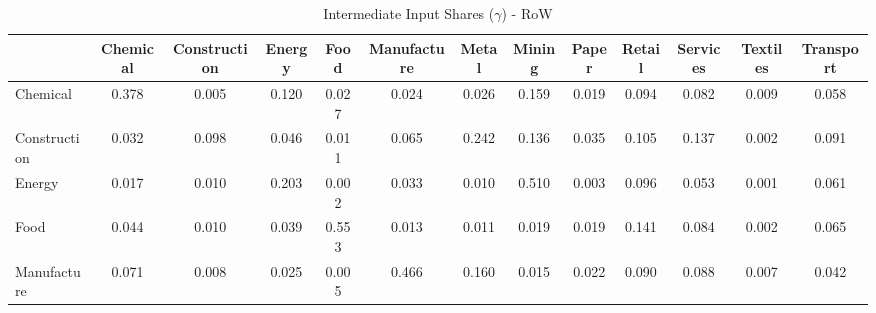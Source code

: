 \begin{table}[htbp]
\centering
\caption{Intermediate Input Shares ($\gamma$) - RoW} 
\label{tab:gamma_RoW}
\begin{tabular}{lcccccccccccc}
  \hline
 & Chemical & Construction & Energy & Food & Manufacture & Metal & Mining & Paper & Retail & Services & Textiles & Transport \\ 
  \hline
Chemical & \textcolor[RGB]{14,9,241}{0.378} & \textcolor[RGB]{234,151,21}{0.005} & \textcolor[RGB]{41,26,214}{0.120} & \textcolor[RGB]{154,100,101}{0.027} & \textcolor[RGB]{168,109,87}{0.024} & \textcolor[RGB]{163,105,92}{0.026} & \textcolor[RGB]{32,21,223}{0.159} & \textcolor[RGB]{181,117,74}{0.019} & \textcolor[RGB]{64,41,191}{0.094} & \textcolor[RGB]{80,52,175}{0.082} & \textcolor[RGB]{220,142,35}{0.009} & \textcolor[RGB]{110,71,145}{0.058} \\ 
  Construction & \textcolor[RGB]{152,99,103}{0.032} & \textcolor[RGB]{57,37,198}{0.098} & \textcolor[RGB]{124,80,131}{0.046} & \textcolor[RGB]{209,135,46}{0.011} & \textcolor[RGB]{103,66,152}{0.065} & \textcolor[RGB]{19,13,236}{0.242} & \textcolor[RGB]{37,24,218}{0.136} & \textcolor[RGB]{149,96,106}{0.035} & \textcolor[RGB]{50,32,205}{0.105} & \textcolor[RGB]{35,23,220}{0.137} & \textcolor[RGB]{246,159,9}{0.002} & \textcolor[RGB]{71,46,184}{0.091} \\ 
  Energy & \textcolor[RGB]{188,121,67}{0.017} & \textcolor[RGB]{214,139,41}{0.010} & \textcolor[RGB]{23,15,232}{0.203} & \textcolor[RGB]{250,162,5}{0.002} & \textcolor[RGB]{151,97,104}{0.033} & \textcolor[RGB]{212,138,42}{0.010} & \textcolor[RGB]{4,2,251}{0.510} & \textcolor[RGB]{241,156,14}{0.003} & \textcolor[RGB]{60,39,195}{0.096} & \textcolor[RGB]{119,77,136}{0.053} & \textcolor[RGB]{253,164,2}{0.001} & \textcolor[RGB]{108,70,147}{0.061} \\ 
  Food & \textcolor[RGB]{128,82,128}{0.044} & \textcolor[RGB]{218,141,37}{0.010} & \textcolor[RGB]{140,91,115}{0.039} & \textcolor[RGB]{0,0,255}{0.553} & \textcolor[RGB]{197,127,58}{0.013} & \textcolor[RGB]{204,132,51}{0.011} & \textcolor[RGB]{179,116,76}{0.019} & \textcolor[RGB]{177,115,78}{0.019} & \textcolor[RGB]{34,22,221}{0.141} & \textcolor[RGB]{78,50,177}{0.084} & \textcolor[RGB]{244,158,11}{0.002} & \textcolor[RGB]{101,65,154}{0.065} \\ 
  Manufacture & \textcolor[RGB]{90,58,165}{0.071} & \textcolor[RGB]{221,143,34}{0.008} & \textcolor[RGB]{166,108,89}{0.025} & \textcolor[RGB]{236,152,19}{0.005} & \textcolor[RGB]{5,3,250}{0.466} & \textcolor[RGB]{30,19,225}{0.160} & \textcolor[RGB]{193,125,62}{0.015} & \textcolor[RGB]{170,110,85}{0.022} & \textcolor[RGB]{74,48,181}{0.090} & \textcolor[RGB]{76,49,179}{0.088} & \textcolor[RGB]{223,144,32}{0.007} & \textcolor[RGB]{135,87,120}{0.042} \\ 

\end{tabular}
\end{table}

